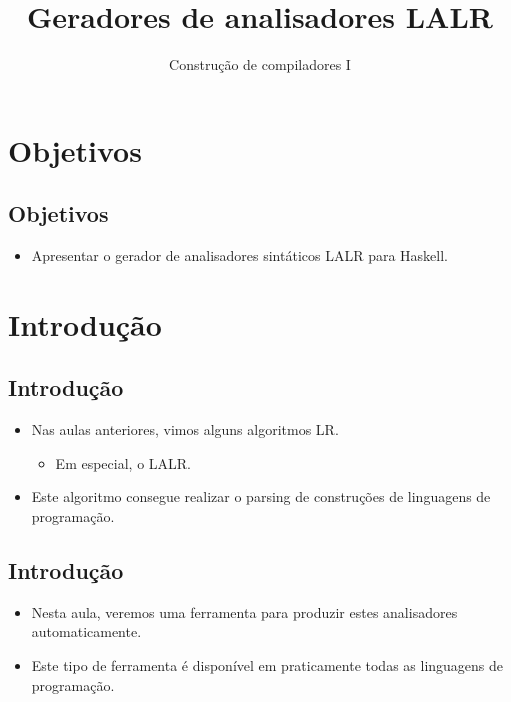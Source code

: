 \documentclass[11pt]{article}
\author{Construção de compiladores I}
\date{}
\title{Geradores de analisadores LALR}
\begin{document}
\maketitle
\section*{Objetivos}
\label{sec:org790d602}

\subsection*{Objetivos}
\label{sec:org755955f}

\begin{itemize}
\item Apresentar o gerador de analisadores sintáticos LALR para Haskell.
\end{itemize}
\section*{Introdução}
\label{sec:org66f10e4}

\subsection*{Introdução}
\label{sec:orgd1775ba}

\begin{itemize}
\item Nas aulas anteriores, vimos alguns algoritmos LR.
\begin{itemize}
\item Em especial, o LALR.
\end{itemize}

\item Este algoritmo consegue realizar o parsing de construções
de linguagens de programação.
\end{itemize}
\subsection*{Introdução}
\label{sec:org100d5db}

\begin{itemize}
\item Nesta aula, veremos uma ferramenta para produzir estes analisadores automaticamente.

\item Este tipo de ferramenta é disponível em praticamente todas as linguagens de programação.
\end{itemize}
\end{document}
